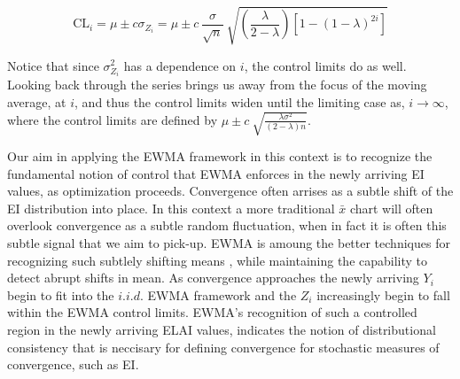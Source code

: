\documentclass{article}
\begin{document}
%
%
\begin{equation}
\text{CL}_i = \mu \pm c \sigma_{Z_i}
=  \mu \pm c ~ \frac{\sigma}{\sqrt{n}}~\sqrt{\left(\frac{\lambda}{2-\lambda}\right)\left[1-(1-\lambda)^{2i}\right]}
\label{EWMACL}
\end{equation}
%
%

%
Notice that since $\sigma^2_{Z_i}$ has a dependence on $i$, the control limits do as well.
Looking back through the series brings us away from the focus of the moving 
average, at $i$, and thus the control limits widen until the limiting case as, 
$i\rightarrow\infty$, where the control limits are defined by 
$\mu \pm c ~ \sqrt{\frac{\lambda\sigma^2}{(2-\lambda)n}}$.

%
Our aim in applying the EWMA framework in this context is to recognize the 
fundamental notion of control that EWMA enforces in the newly arriving EI 
values, as optimization proceeds. Convergence often arrises as a subtle shift 
of the EI distribution into place. In this context a more traditional $\bar x$ 
chart will often overlook convergence as a subtle random fluctuation, when in 
fact it is often this subtle signal that we aim to pick-up. EWMA is amoung the 
better techniques for recognizing such subtlely shifting means \cite{aerne1991trend,zou2009compare}, 
while maintaining the capability to detect abrupt shifts in mean. As 
convergence approaches the newly arriving $Y_i$ begin to fit into the $i.i.d.$ 
EWMA framework and the $Z_i$ increasingly begin to fall within the EWMA 
control limits. EWMA's recognition of such a controlled region in the newly 
arriving ELAI values, indicates the notion of distributional consistency that 
is neccisary for defining convergence for stochastic measures of convergence, 
such as EI. 



\end{document}
